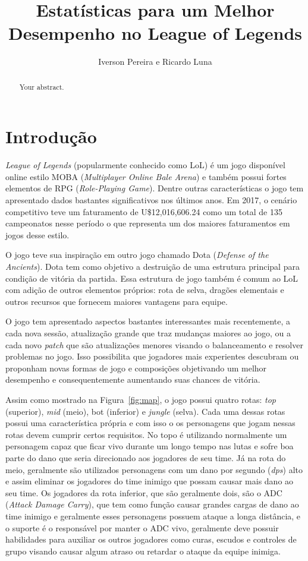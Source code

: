 \documentclass[a4paper]{article}
\title{Estatísticas para um Melhor Desempenho no League of Legends}
\author{Iverson Pereira e Ricardo Luna}
\begin{document}
\maketitle

\begin{abstract}
Your abstract.
\end{abstract}

\section{Introdução}

\textit{League of Legends} (popularmente conhecido como LoL) é um jogo disponível online estilo MOBA (\textit{Multiplayer Online Bale Arena}) e também possui fortes elementos de RPG (\textit{Role-Playing Game}). Dentre outras características o jogo tem apresentado dados bastantes significativos nos últimos anos. Em 2017, o cenário competitivo teve um faturamento de U\$12,016,606.24 como um total de 135 campeonatos nesse período o que representa um dos maiores faturamentos em jogos desse estilo.  

O jogo teve sua inspiração em outro jogo chamado Dota (\textit{Defense of the Ancients}). Dota tem como objetivo a destruição de uma estrutura principal para condição de vitória da partida. Essa estrutura de jogo também é comum ao LoL com adição de outros elementos próprios: rota de selva, dragões elementais e outros recursos que fornecem maiores vantagens para equipe.  

O jogo tem apresentado aspectos bastantes interessantes mais recentemente, a cada nova sessão, atualização grande que traz mudanças maiores ao jogo, ou a cada novo \textit{patch} que são atualizações menores visando o balanceamento e resolver problemas no jogo. Isso possibilita que jogadores mais experientes descubram ou proponham novas formas de jogo e composições objetivando um melhor desempenho e consequentemente aumentando suas chances de vitória. 


Assim como mostrado na Figura~\ref{fig:map}, o jogo possui quatro rotas: \textit{top} (superior), \textit{mid} (meio), bot (inferior) e \textit{jungle} (selva). Cada uma dessas rotas possui uma característica própria e com isso o os personagens que jogam nessas rotas devem cumprir certos requisitos.  No topo é utilizando normalmente um personagem capaz que ficar vivo durante um longo tempo nas lutas e sofre boa parte do dano que seria direcionado aos jogadores de seu time. Já na rota do meio, geralmente são utilizados personagens com um dano por segundo (\textit{dps}) alto e assim eliminar os jogadores do time inimigo que possam causar mais dano ao seu time. Os jogadores da rota inferior, que são geralmente dois, são o ADC (\textit{Attack Damage Carry}), que tem como função causar grandes cargas de dano ao time inimigo e geralmente esses personagens possuem ataque a longa distância, e o suporte é o responsável por manter o ADC vivo, geralmente deve possuir habilidades para auxiliar os outros jogadores como curas, escudos e controles de grupo visando causar algum atraso ou retardar o ataque da equipe inimiga. 
\end{document}
